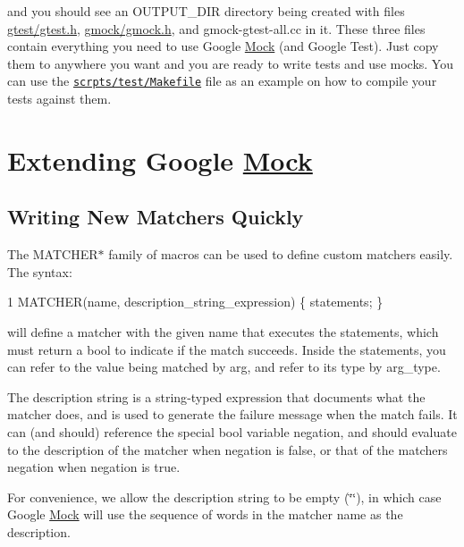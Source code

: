 and you should see an {\ttfamily O\+U\+T\+P\+U\+T\+\_\+\+D\+IR} directory being created with files {\ttfamily \hyperlink{gtest_8h}{gtest/gtest.\+h}}, {\ttfamily \hyperlink{gmock_8h}{gmock/gmock.\+h}}, and {\ttfamily gmock-\/gtest-\/all.\+cc} in it. These three files contain everything you need to use Google \hyperlink{class_mock}{Mock} (and Google Test). Just copy them to anywhere you want and you are ready to write tests and use mocks. You can use the \href{../scripts/test/Makefile}{\tt scrpts/test/\+Makefile} file as an example on how to compile your tests against them.

\section*{Extending Google \hyperlink{class_mock}{Mock}}

\subsection*{Writing New Matchers Quickly}

The {\ttfamily M\+A\+T\+C\+H\+E\+R$\ast$} family of macros can be used to define custom matchers easily. The syntax\+:


\begin{DoxyCode}
1 MATCHER(name, description\_string\_expression) \{ statements; \}
\end{DoxyCode}


will define a matcher with the given name that executes the statements, which must return a {\ttfamily bool} to indicate if the match succeeds. Inside the statements, you can refer to the value being matched by {\ttfamily arg}, and refer to its type by {\ttfamily arg\+\_\+type}.

The description string is a {\ttfamily string}-\/typed expression that documents what the matcher does, and is used to generate the failure message when the match fails. It can (and should) reference the special {\ttfamily bool} variable {\ttfamily negation}, and should evaluate to the description of the matcher when {\ttfamily negation} is {\ttfamily false}, or that of the matcher\textquotesingle{}s negation when {\ttfamily negation} is {\ttfamily true}.

For convenience, we allow the description string to be empty ({\ttfamily \char`\"{}\char`\"{}}), in which case Google \hyperlink{class_mock}{Mock} will use the sequence of words in the matcher name as the description.

